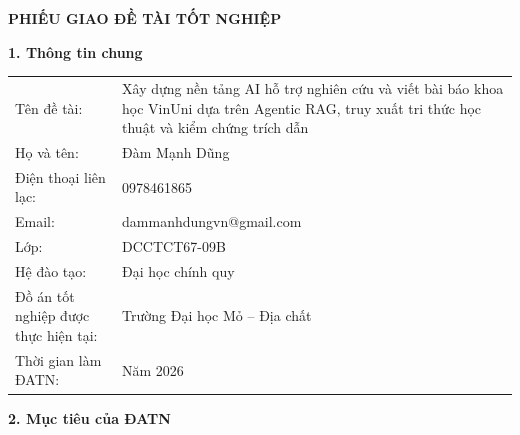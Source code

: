
\thispagestyle{adminform}
{}

\begin{center}
    {\fontsize{14pt}{17pt}\selectfont \textbf{PHIẾU GIAO ĐỀ TÀI TỐT NGHIỆP}}
\end{center}

\vspace{0.06cm}
\noindent \textbf{1. Thông tin chung}
\vspace{0.04cm}

\noindent
\begin{tabularx}{\textwidth}{@{}p{6.8cm} X@{}}
Tên đề tài: & Xây dựng nền tảng AI hỗ trợ nghiên cứu và viết bài báo khoa học VinUni dựa trên Agentic RAG, truy xuất tri thức học thuật và kiểm chứng trích dẫn \\[0.12cm]
Họ và tên: & Đàm Mạnh Dũng \\[0.12cm]
Điện thoại liên lạc: & 0978461865 \\[0.12cm]
Email: & dammanhdungvn@gmail.com \\[0.12cm]
Lớp: & DCCTCT67-09B \\[0.12cm]
Hệ đào tạo: & Đại học chính quy \\[0.12cm]
Đồ án tốt nghiệp được thực hiện tại: & Trường Đại học Mỏ -- Địa chất \\[0.12cm]
Thời gian làm ĐATN: & Năm 2026 \\
\end{tabularx}

\vspace{0.15cm}
\noindent \textbf{2. Mục tiêu của ĐATN}
\vspace{0.04cm}

